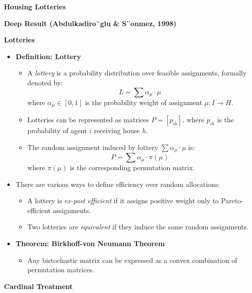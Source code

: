 \documentclass[8pt]{scrartcl}
\renewcommand{\section}[1]{\begin{center}\textbf{\color{red}#1}\end{center}}
\begin{document}
\begin{multicols*}{2}
    \section{Housing Lotteries}

    \textbf{Deep Result (Abdulkadiro˘glu \& S¨onmez, 1998)}

\section{Lotteries}

\begin{itemize}
    \item \textbf{Definition: Lottery}
    \begin{itemize}
        \item A \textit{lottery} is a probability distribution over feasible assignments, formally denoted by:
        $$ L = \sum \alpha_\mu \cdot \mu $$
        where $\alpha_\mu \in [0, 1]$ is the probability weight of assignment $\mu: I\to H$.
        \item Lotteries can be represented as matrices $P = [p_{ih}]$, where $p_{ih}$ is the probability of agent $i$ receiving house $h$.
        \item The random assignment induced by lottery $\sum \alpha_\mu \cdot \mu$ is:
        $$ P = \sum \alpha_\mu \cdot \pi(\mu) $$
        where $\pi(\mu)$ is the corresponding permutation matrix.
    \end{itemize}
    \item There are various ways to define efficiency over random allocations:
    \begin{itemize}
        \item A lottery is \textit{ex-post efficient} if it assigns positive weight only to Pareto-efficient assignments.
        \item Two lotteries are \textit{equivalent} if they induce the same random assignments.
    \end{itemize}
    \item \textbf{Theorem: Birkhoff-von Neumann Theorem}
    \begin{itemize}
        \item Any bistochastic matrix can be expressed as a convex combination of permutation matrices.
    \end{itemize}
\end{itemize}

\section{Cardinal Treatment}


\end{multicols*}
\end{document}
